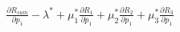 \documentclass[preview]{standalone}
\begin{document}
\begin{align*}
\frac{\partial {R_{sum}}}{\partial {p_1}} - \lambda^\ast + \mu_1^\ast \frac{\partial {R_1}}{\partial {p_1}} + \mu_2^\ast \frac{\partial {R_2}}{\partial {p_1}} + \mu_3^\ast \frac{\partial {R_3}}{\partial {p_1}}
\end{align*}
\end{document}
